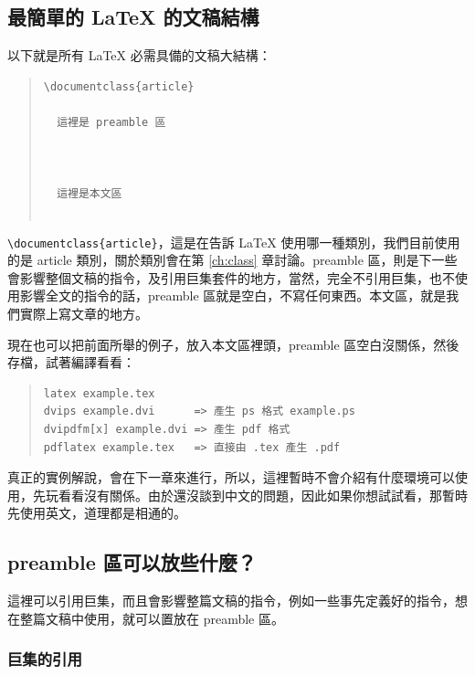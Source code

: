 \subsection{最簡單的 \LaTeX{} 的文稿結構}

以下就是所有 \LaTeX{} 必需具備的文稿大結構：

\begin{quote}
   \begin{verbatim}
\documentclass{article}

  這裡是 preamble 區



  這裡是本文區


\end{verbatim}
\end{quote}

\verb|\documentclass{article}|，這是在告訴 \LaTeX{} 使用哪一種類別，我們目前使用的是 {\ttfamily article} 類別，關於類別會在第 \ref{ch:class} 章討論。preamble 區，則是下一些會影響整個文稿的指令，及引用巨集套件的地方，當然，完全不引用巨集，也不使用影響全文的指令的話，preamble 區就是空白，不寫任何東西。本文區，就是我們實際上寫文章的地方。

現在也可以把前面所舉的例子，放入本文區裡頭，preamble 區空白沒關係，然後存檔，試著編譯看看：

\begin{quote}
   \begin{verbatim}
latex example.tex
dvips example.dvi      => 產生 ps 格式 example.ps
dvipdfm[x] example.dvi => 產生 pdf 格式
pdflatex example.tex   => 直接由 .tex 產生 .pdf
\end{verbatim}
\end{quote}

真正的實例解說，會在下一章來進行，所以，這裡暫時不會介紹有什麼環境可以使用，先玩看看沒有關係。由於還沒談到中文的問題，因此如果你想試試看，那暫時先使用英文，道理都是相通的。

\subsection{preamble 區可以放些什麼？}
\label{subsec:preamble}

這裡可以引用巨集，而且會影響整篇文稿的指令，例如一些事先定義好的指令，想在整篇文稿中使用，就可以置放在 preamble 區。

\subsubsection{巨集的引用}
\label{subsubsec:package}

